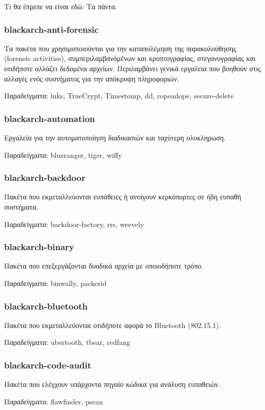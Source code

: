 \documentclass[a4paper, oneside, 11pt]{book}
\begin{document}
Τι θα έπρεπε να είναι εδώ: Τα πάντα.

\subsubsection{blackarch-anti-forensic}
Τα πακέτα που χρησιμοποιούνται για την καταπολέμηση της παρακολούθησης
(forensic activities), συμπεριλαμβανόμένων και κρυπτογραφίας, στεγανογραφίας και
οτιδήποτε αλλάζει δεδομένα αρχείων. Περιλαμβάνει γενικά εργαλεία που βοηθούν στις
αλλαγές ενός συστήματος για την απόκρυψη πληροφοριών.

Παραδείγματα: luks, TrueCrypt, Timestomp, dd, ropeadope, secure-delete

\subsubsection{blackarch-automation}
Εργαλεία για την αυτοματοποίηση διαδικασιών και ταχύτερη ολοκληρωση.

Παραδείγματα: blueranger, tiger, wiffy

\subsubsection{blackarch-backdoor}
Πακέτα που εκμεταλλεύονται ευπάθειες ή ανοίγουν κερκόπορτες σε ήδη
ευπαθή συστήματα.

Παραδείγματα: backdoor-factory, rrs, weevely

\subsubsection{blackarch-binary}
Πακέτα που επεξεργάζονται δυαδικά αρχεία με οποιοδήποτε τρόπο.

Παραδείγματα: binwally, packerid

\subsubsection{blackarch-bluetooth}
Πακέτα που εκμεταλλεύονται οτιδήποτε αφορά το Bluetooth (802.15.1).

Παραδείγματα: ubertooth, tbear, redfang

\subsubsection{blackarch-code-audit}
Πακέτα που ελέγχουν υπάρχοντα πηγαίο κώδικα για ανάλυση ευπαθειών.

Παραδείγματα: flawfinder, pscan
\end{document}
